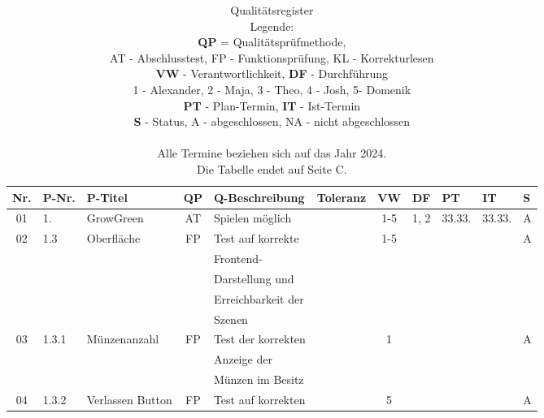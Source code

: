 \begin{longtable}{|c|l|l|c|l|l|c|c|l|l|l|}
    \caption[Qualitätsregister]{Qualitätsregister \\ Legende: \\
            \textbf{QP} = Qualitätsprüfmethode, \\
            AT - Abschlusstest, FP - Funktionsprüfung, KL - Korrekturlesen \\
            \textbf{VW} - Verantwortlichkeit, \textbf{DF} - Durchführung\\
            1 - Alexander, 2 - Maja, 3 - Theo, 4 - Josh, 5- Domenik \\
            \textbf{PT} - Plan-Termin, \textbf{IT} - Ist-Termin\\
            \textbf{S} - Status, A - abgeschlossen, NA - nicht abgeschlossen \\\\
            Alle Termine beziehen sich auf das Jahr 2024.\\
            Die Tabelle endet auf Seite C.\\}
    \label{tab:quality}\\
            \hline
            Nr. & P-Nr. & P-Titel & QP & Q-Beschreibung & Toleranz & VW & DF & PT & IT & S \\[0.5ex]
            \hline\hline
            01 & 1. & GrowGreen & AT & Spielen möglich & & 1-5 & 1, 2 & 33.33. & 33.33. & A \\
            \hline
            02 & 1.3 & Oberfläche & FP & Test auf korrekte &  & 1-5 &  &  &  & A \\
               &       &            &    & Frontend- &   &   & & & &\\
               &       &            &    & Darstellung und &   &   & & & &\\
               &       &            &    & Erreichbarkeit der &   &   & & & &\\
               &       &            &    & Szenen &   &   & & & &\\
            \hline
            03 & 1.3.1 & Münzenanzahl & FP & Test der korrekten &  & 1 &  &  &  & A \\
            &       &            &    & Anzeige der &   &   & & & &\\
            &       &            &    & Münzen im Besitz &   &   & & & &\\
            \hline
            04 & 1.3.2 & Verlassen Button & FP & Test auf korrekten &  & 5 &  &  &  & A \\

\end{longtable}

